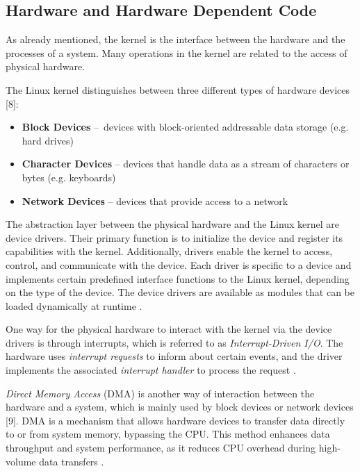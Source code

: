 \subsection{Hardware and Hardware Dependent Code} \label{chap:hwdependcode}

As already mentioned, the kernel is the interface between the hardware and the processes of a system. Many operations in the kernel are related to the access of physical hardware.

The Linux kernel distinguishes between three different types of hardware devices [8]:

\begin{itemize}
\item \textbf{Block Devices} – devices with block-oriented addressable data storage (e.g. hard drives)
\item \textbf{Character Devices} – devices that handle data as a stream of characters or bytes (e.g. keyboards)
\item \textbf{Network Devices} – devices that provide access to a network
\end{itemize}

The abstraction layer between the physical hardware and the Linux kernel are device drivers. Their primary function is to initialize the device and register its capabilities with the kernel. Additionally, drivers enable the kernel to access, control, and communicate with the device. Each driver is specific to a device and implements certain predefined interface functions to the Linux kernel, depending on the type of the device. The device drivers are available as modules that can be loaded dynamically at runtime \cite{like09}.

One way for the physical hardware to interact with the kernel via the device drivers is through interrupts, which is referred to as \textit{Interrupt-Driven I/O}. The hardware uses \textit{interrupt requests} to inform about certain events, and the driver implements the associated \textit{interrupt handler} to process the request \cite{like09}.

\textit{Direct Memory Access} (DMA) is another way of interaction between the hardware and a system, which is mainly used by block devices or network devices [9]. DMA is a mechanism that allows hardware devices to transfer data directly to or from system memory, bypassing the CPU. This method enhances data throughput and system performance, as it reduces CPU overhead during high-volume data transfers \cite{like05}.


